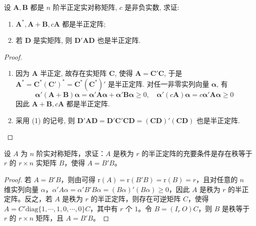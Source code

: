 \documentclass[../../main.tex]{subfiles}
\begin{document}
\begin{proposition}\label{proposition:半正定阵的相关性质}
设 \(\boldsymbol{A},\boldsymbol{B}\) 都是 \(n\) 阶半正定实对称矩阵, \(c\) 是非负实数, 求证:
\begin{enumerate}[(1)]
\item \(\boldsymbol{A}^*,\boldsymbol{A}+\boldsymbol{B},c\boldsymbol{A}\) 都是半正定阵;
\item 若 \(\boldsymbol{D}\) 是实矩阵, 则 \(\boldsymbol{D}'\boldsymbol{A}\boldsymbol{D}\) 也是半正定阵.
\end{enumerate}
\end{proposition}
\begin{proof}
\begin{enumerate}[(1)]
\item 因为 \(\boldsymbol{A}\) 半正定, 故存在实矩阵 \(\boldsymbol{C}\), 使得 \(\boldsymbol{A}=\boldsymbol{C}'\boldsymbol{C}\), 于是 \(\boldsymbol{A}^*=\boldsymbol{C}^*(\boldsymbol{C}')^*=\boldsymbol{C}^*(\boldsymbol{C}^*)'\) 是半正定阵. 对任一非零实列向量 \(\boldsymbol{\alpha}\), 有
\[\boldsymbol{\alpha}'(\boldsymbol{A}+\boldsymbol{B})\boldsymbol{\alpha}=\boldsymbol{\alpha}'\boldsymbol{A}\boldsymbol{\alpha}+\boldsymbol{\alpha}'\boldsymbol{B}\boldsymbol{\alpha}\geqslant 0,\quad\boldsymbol{\alpha}'(c\boldsymbol{A})\boldsymbol{\alpha}=c\boldsymbol{\alpha}'\boldsymbol{A}\boldsymbol{\alpha}\geqslant 0\]
因此 \(\boldsymbol{A}+\boldsymbol{B},c\boldsymbol{A}\) 都是半正定阵.
\item 采用 (1) 的记号, 则 \(\boldsymbol{D}'\boldsymbol{A}\boldsymbol{D}=\boldsymbol{D}'\boldsymbol{C}'\boldsymbol{C}\boldsymbol{D}=(\boldsymbol{C}\boldsymbol{D})'(\boldsymbol{C}\boldsymbol{D})\) 也是半正定阵.
\end{enumerate} 
\end{proof}

\begin{proposition}\label{proposition:半正定阵的行满秩分解}
设 $A$ 为 $n$ 阶实对称矩阵，求证：$A$ 是秩为 $r$ 的半正定阵的充要条件是存在秩等于 $r$ 的 $r\times n$ 实矩阵 $B$，使得 $A = B'B$。 
\end{proposition}
\begin{proof}
若 $A = B'B$，则由可得 $\mathrm{r}(A)=\mathrm{r}(B'B)=\mathrm{r}(B)=r$，且对任意的 $n$ 维实列向量 $\alpha$，$\alpha'A\alpha=\alpha'B'B\alpha=(B\alpha)'(B\alpha)\geqslant 0$，因此 $A$ 是秩为 $r$ 的半正定阵。反之，若 $A$ 是秩为 $r$ 的半正定阵，则存在可逆矩阵 $C$，使得 $A = C'\mathrm{diag}\{1,\cdots,1,0,\cdots,0\}C$，其中有 $r$ 个 $1$。令 $B=(I_r\ O)C$，则 $B$ 是秩等于 $r$ 的 $r\times n$ 矩阵，且 $A = B'B$。 
\end{proof}
\end{document}
